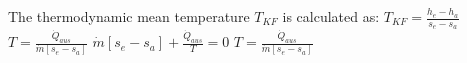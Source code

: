 The thermodynamic mean temperature \( T_{KF} \) is calculated as:  
\( T_{KF} = \frac{h_e - h_a}{s_e - s_a} \)  
\( T = \frac{\dot{Q}_{aus}}{\dot{m} [s_e - s_a]} \)  
\( \dot{m} [s_e - s_a] + \frac{\dot{Q}_{aus}}{T} = 0 \)  
\( T = \frac{\dot{Q}_{aus}}{\dot{m} [s_e - s_a]} \)